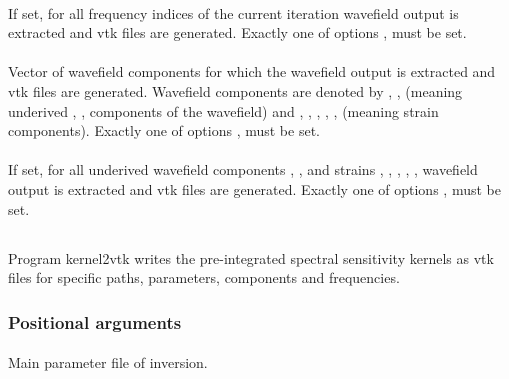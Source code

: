 \paragraph{}
If set, for all frequency indices of the current iteration wavefield output is extracted and 
vtk files are generated. Exactly one of options  ,  must be set.
\paragraph{}
Vector of  wavefield components for which the wavefield output is extracted and 
vtk files are generated. 
Wavefield components are denoted by , ,  (meaning underived , , 
 components of the wavefield) and , , , , ,  
(meaning strain components). 
Exactly one of options ,  must be set.
\paragraph{}
If set, for all underived wavefield components , ,  and
strains , , , , ,  wavefield output is extracted and 
vtk files are generated. 
Exactly one of options ,  must be set.
%
%
\subsection{} \label{programs_scripts,sec:bin_prog,sec:kernel_2_vtk}
Program kernel2vtk writes the pre-integrated spectral sensitivity kernels as vtk files for specific paths, parameters, components and frequencies.
\subsubsection{Positional arguments}
\paragraph{}
Main parameter file of inversion.

